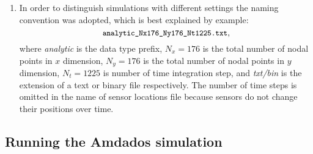 \documentclass[]{article}
\begin{document}
\begin{enumerate}
\begin{itemize}
    \item Text file of \textit{observations} at sensor locations: ``\textit{analytic*.txt}''.
    \end{itemize}
    The first of these file is generated by \texttt{Amdados} application running in
    special scenario\footnote{Sensors' generation by Python is too slow, so we use C++ implementation instead.}, e.g.:
    $$
    \mbox{\small\texttt{build/app/amdados --scenario sensors --config config-file-name}}
    $$
    For convenience, is a file of sensor locations was not found in the output directory\footnote{Parameter \textit{output\_dir}.} upon launching the script ``\textit{python/ObservationsGenerator.py}'', the \texttt{Amdados} application will be automatically run in aforementioned scenario to generate sensors (pseudo) randomly seeded inside the domain.
\item In order to distinguish simulations with different settings the naming convention was adopted, which is best explained by example:
$$
\mbox{\small\texttt{analytic\_Nx176\_Ny176\_Nt1225.txt}},
$$
where \textit{analytic} is the \textsf{data type prefix}, $N_x=176$ is the total number of nodal points in $x$ dimension, $N_y=176$ is the total number of nodal points in $y$ dimension, $N_t=1225$ is number of time integration step, and \textit{txt/bin} is the extension of a text or binary file respectively. The number of time steps is omitted in the name of sensor locations file because sensors do not change their positions over time.
\end{enumerate}

\subsection{Running the Amdados simulation}
\end{document}
